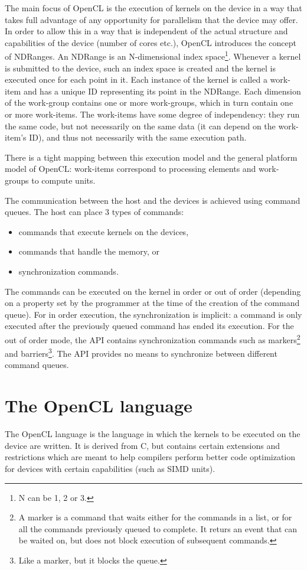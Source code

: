 The main focus of OpenCL is the execution of kernels on the device in a way that takes full advantage of any opportunity for parallelism that the device may offer. In order to allow this in a way that is independent of the actual structure and capabilities of the device (number of cores etc.), OpenCL introduces the concept of NDRanges. An NDRange is an N-dimensional index space\footnote{N can be 1, 2 or 3.}. Whenever a kernel is submitted to the device, such an index space is created and the kernel is executed once for each point in it. Each instance of the kernel is called a work-item and has a unique ID representing its point in the NDRange. Each dimension of the work-group contains one or more work-groups, which in turn contain one or more work-items. The work-items have some degree of independency: they run the same code, but not necessarily on the same data (it can depend on the work-item's ID), and thus not necessarily with the same execution path.

There is a tight mapping between this execution model and the general platform model of OpenCL: work-items correspond to processing elements and work-groups to compute units.

The communication between the host and the devices is achieved using command queues. The host can place 3 types of commands:
\begin{itemize}
\item commands that execute kernels on the devices,
\item commands that handle the memory, or 
\item synchronization commands.
\end{itemize}
The commands can be executed on the kernel in order or out of order (depending on a property set by the programmer at the time of the creation of the command queue). For in order execution, the synchronization is implicit: a command is only executed after the previously queued command has ended its execution. For the out of order mode, the API contains synchronization commands such as markers\footnote{A marker is a command that waits either for the commands in a list, or for all the commands previously queued to complete. It returs an event that can be waited on, but does not block execution of subsequent commands.} and barriers\footnote{Like a marker, but it blocks the queue.}. The API provides no means to synchronize between different command queues.

\section{The OpenCL language}
\label{section:ocl-language}
The OpenCL language is the language in which the kernels to be executed on the device are written. It is derived from C, but contains certain extensions and restrictions which are meant to help compilers perform better code optimization for devices with certain capabilities (such as SIMD units).

